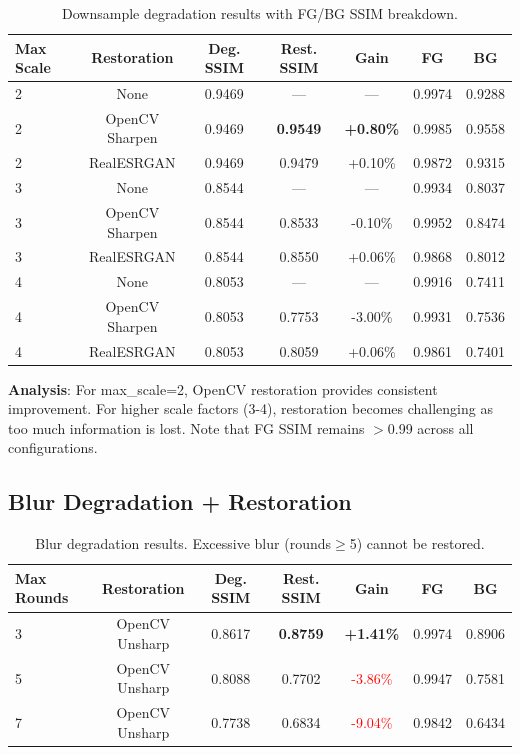 \documentclass[11pt,a4paper]{article}
\begin{document}
\begin{table}[h]
\centering
\begin{tabular}{lcccccc}
\toprule
\textbf{Max Scale} & \textbf{Restoration} & \textbf{Deg. SSIM} & \textbf{Rest. SSIM} & \textbf{Gain} & \textbf{FG} & \textbf{BG} \\
\midrule
2 & None & 0.9469 & --- & --- & 0.9974 & 0.9288 \\
2 & OpenCV Sharpen & 0.9469 & \textbf{0.9549} & \textbf{+0.80\%} & 0.9985 & 0.9558 \\
2 & RealESRGAN & 0.9469 & 0.9479 & +0.10\% & 0.9872 & 0.9315 \\
\midrule
3 & None & 0.8544 & --- & --- & 0.9934 & 0.8037 \\
3 & OpenCV Sharpen & 0.8544 & 0.8533 & -0.10\% & 0.9952 & 0.8474 \\
3 & RealESRGAN & 0.8544 & 0.8550 & +0.06\% & 0.9868 & 0.8012 \\
\midrule
4 & None & 0.8053 & --- & --- & 0.9916 & 0.7411 \\
4 & OpenCV Sharpen & 0.8053 & 0.7753 & -3.00\% & 0.9931 & 0.7536 \\
4 & RealESRGAN & 0.8053 & 0.8059 & +0.06\% & 0.9861 & 0.7401 \\
\bottomrule
\end{tabular}
\caption{Downsample degradation results with FG/BG SSIM breakdown.}
\label{tab:downsample}
\end{table}

\textbf{Analysis}: For max\_scale=2, OpenCV restoration provides consistent improvement. For higher scale factors (3-4), restoration becomes challenging as too much information is lost. Note that FG SSIM remains $>$0.99 across all configurations.

\subsection{Blur Degradation + Restoration}

\begin{table}[h]
\centering
\begin{tabular}{lcccccc}
\toprule
\textbf{Max Rounds} & \textbf{Restoration} & \textbf{Deg. SSIM} & \textbf{Rest. SSIM} & \textbf{Gain} & \textbf{FG} & \textbf{BG} \\
\midrule
3 & OpenCV Unsharp & 0.8617 & \textbf{0.8759} & \textbf{+1.41\%} & 0.9974 & 0.8906 \\
5 & OpenCV Unsharp & 0.8088 & 0.7702 & \textcolor{red}{-3.86\%} & 0.9947 & 0.7581 \\
7 & OpenCV Unsharp & 0.7738 & 0.6834 & \textcolor{red}{-9.04\%} & 0.9842 & 0.6434 \\
\bottomrule
\end{tabular}
\caption{Blur degradation results. Excessive blur (rounds$\geq$5) cannot be restored.}
\label{tab:blur}
\end{table}
\end{document}
